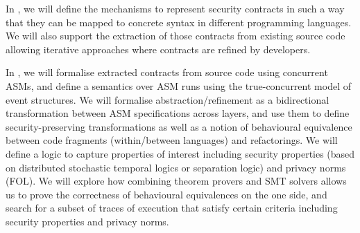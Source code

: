 \begin{Workpackage}{\thewpno}
\begin{WPDescription}
\end{WPDescription}


\begin{Task}

\TaskResults{%
}
\TaskHeader{}

In \theTask, we will define the mechanisms to represent security contracts
in such a way that they can be mapped to concrete syntax in different
programming languages. We will also support the extraction of those contracts
from existing source code allowing iterative approaches where contracts
are refined by developers.
\end{Task}

\begin{Task}

\TaskResults{%
}
\TaskHeader{}

In \theTask, we will formalise extracted contracts from source code using concurrent ASMs, and define a semantics over ASM runs using the true-concurrent model of event structures. 
We will formalise abstraction/refinement as a bidirectional transformation between ASM specifications across layers, and use them to define 
security-preserving transformations as well as a notion of behavioural equivalence between code fragments (within/between languages) and refactorings.
We will define a logic to capture properties of interest  including security properties (based on distributed stochastic temporal logics or separation
logic) and privacy norms (FOL).
We will explore how combining theorem provers and SMT solvers allows us to prove the correctness of behavioural equivalences on the one side, and search for a subset of traces of execution that satisfy certain criteria including security properties and privacy norms.

\end{Task}




\end{Workpackage}
